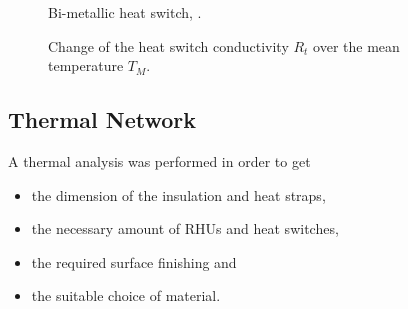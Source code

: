 \begin{figure}[H]
	\centering
	\qquad\qquad
	\caption{Bi-metallic heat switch, \cite{ref_tcs_04}.}
	\label{fig:tcs_switch01}
\end{figure}

\begin{figure}[H]
	\centering
	\qquad
	\caption{Change of the heat switch conductivity $R_t$ over the mean temperature $T_M$.}
	\label{fig:tcs_switch02}
\end{figure}

\subsection{Thermal Network}
A thermal analysis was performed in order to get
\begin{itemize}
	\item the dimension of the insulation and heat straps,
	\item the necessary amount of RHUs and heat switches,
	\item the required surface finishing and
	\item the suitable choice of material.\\
\end{itemize}

